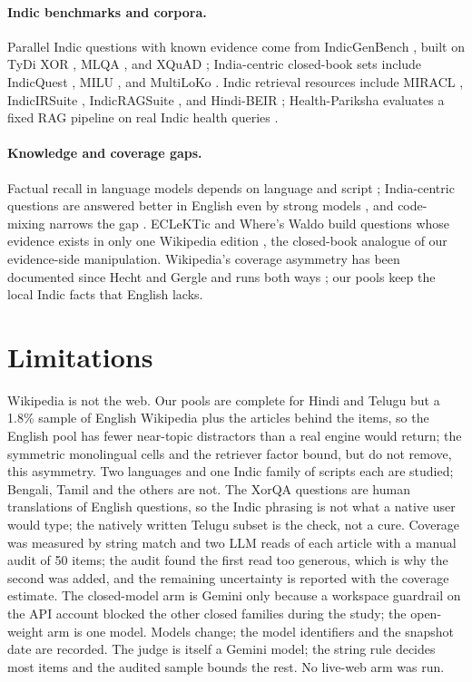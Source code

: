 \paragraph{Indic benchmarks and corpora.} Parallel Indic questions with known evidence come from IndicGenBench \citep{a2404_16816}, built on TyDi XOR \citep{a2010_11856,clark2020tydi}, MLQA \citep{a1910_07475}, and XQuAD \citep{a1910_11856}; India-centric closed-book sets include IndicQuest \citep{a2608_15535,a2504_20022}, MILU \citep{a2411_02538}, and MultiLoKo \citep{a2504_10356}. Indic retrieval resources include MIRACL \citep{a2210_09984}, IndicIRSuite \citep{a2312_09508}, IndicRAGSuite \citep{a2506_01615}, and Hindi-BEIR \citep{a2408_09437}; Health-Pariksha evaluates a fixed RAG pipeline on real Indic health queries \citep{a2410_13671}.

\paragraph{Knowledge and coverage gaps.} Factual recall in language models depends on language and script \citep{a2010_06189,a2102_00894,a2406_16135,a2510_15551}; India-centric questions are answered better in English even by strong models \citep{a2504_20022}, and code-mixing narrows the gap \citep{a2605_29637}. ECLeKTic and Where's Waldo build questions whose evidence exists in only one Wikipedia edition \citep{a2502_21228,a2610_00606}, the closed-book analogue of our evidence-side manipulation. Wikipedia's coverage asymmetry has been documented since Hecht and Gergle \citep{hecht2010tower} and runs both ways \citep{a2505_24195}; our pools keep the local Indic facts that English lacks.

\section{Limitations}
\label{sec:limits}
Wikipedia is not the web. Our pools are complete for Hindi and Telugu but a 1.8\% sample of English Wikipedia plus the articles behind the items, so the English pool has fewer near-topic distractors than a real engine would return; the symmetric monolingual cells and the retriever factor bound, but do not remove, this asymmetry. Two languages and one Indic family of scripts each are studied; Bengali, Tamil and the others are not. The XorQA questions are human translations of English questions, so the Indic phrasing is not what a native user would type; the natively written Telugu subset is the check, not a cure. Coverage was measured by string match and two LLM reads of each article with a manual audit of 50 items; the audit found the first read too generous, which is why the second was added, and the remaining uncertainty is reported with the coverage estimate. The closed-model arm is Gemini only because a workspace guardrail on the API account blocked the other closed families during the study; the open-weight arm is one model. Models change; the model identifiers and the snapshot date are recorded. The judge is itself a Gemini model; the string rule decides most items and the audited sample bounds the rest. No live-web arm was run.


